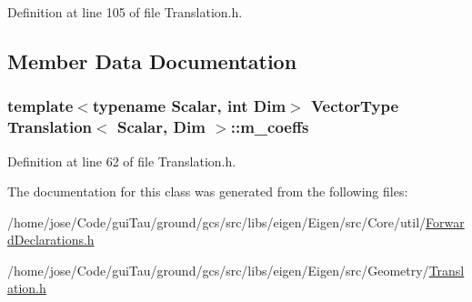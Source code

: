 Definition at line 105 of file Translation.\-h.



\subsection{Member Data Documentation}
\hypertarget{class_translation_ad8d42112aef505dd1db6a56dc797ee8a}{
\subsubsection[{m\-\_\-coeffs}]{\setlength{\rightskip}{0pt plus 5cm}template$<$typename Scalar, int Dim$>$ {\bf Vector\-Type} {\bf Translation}$<$ {\bf Scalar}, Dim $>$\-::m\-\_\-coeffs\hspace{0.3cm}{\ttfamily [protected]}}}\label{class_translation_ad8d42112aef505dd1db6a56dc797ee8a}


Definition at line 62 of file Translation.\-h.



The documentation for this class was generated from the following files\-:\begin{DoxyCompactItemize}
\item 
/home/jose/\-Code/gui\-Tau/ground/gcs/src/libs/eigen/\-Eigen/src/\-Core/util/\hyperlink{_forward_declarations_8h}{Forward\-Declarations.\-h}\item 
/home/jose/\-Code/gui\-Tau/ground/gcs/src/libs/eigen/\-Eigen/src/\-Geometry/\hyperlink{_translation_8h}{Translation.\-h}\end{DoxyCompactItemize}
